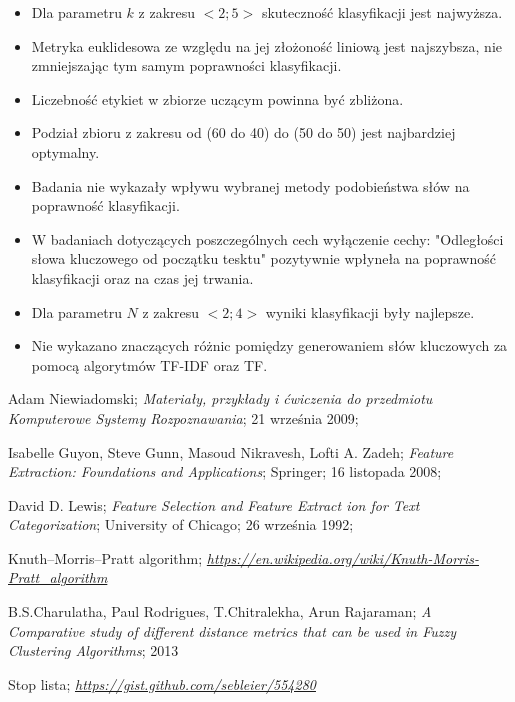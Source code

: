 \documentclass{classrep}
\begin{document}
\begin{itemize}
    \item Dla parametru $k$ z zakresu $<2;5>$ skuteczność klasyfikacji jest najwyższa.
    \item Metryka euklidesowa ze względu na jej złożoność liniową jest najszybsza, nie zmniejszając
            tym samym poprawności klasyfikacji.
    \item Liczebność etykiet w zbiorze uczącym powinna być zbliżona.
    \item Podział zbioru z zakresu od (60 do 40) do (50 do 50) jest najbardziej optymalny.
    \item Badania nie wykazały wpływu wybranej metody podobieństwa słów na poprawność klasyfikacji.
    \item W badaniach dotyczących poszczególnych cech wyłączenie cechy: "Odległości słowa kluczowego
        od początku tesktu" pozytywnie wpłyneła na poprawność klasyfikacji oraz na czas jej trwania.
    \item Dla parametru $N$ z zakresu $<2;4>$ wyniki klasyfikacji były najlepsze.
    \item Nie wykazano znaczących różnic pomiędzy generowaniem słów kluczowych za pomocą algorytmów TF-IDF oraz TF.
\end{itemize}


\begin{thebibliography}{0}

 Adam Niewiadomski;
\textsl{Materiały, przykłady i ćwiczenia do przedmiotu
Komputerowe Systemy Rozpoznawania}; 21 września 2009;

 Isabelle Guyon, Steve Gunn, Masoud Nikravesh, Lofti A. Zadeh;
\textsl{Feature Extraction: Foundations and Applications}; Springer; 16 listopada 2008;

 David D. Lewis;
\textsl{Feature Selection and Feature Extract ion for Text Categorization}; University of Chicago; 26 września 1992;

 Knuth–Morris–Pratt algorithm;
\textsl{\url{https://en.wikipedia.org/wiki/Knuth-Morris-Pratt_algorithm}}

 B.S.Charulatha, Paul Rodrigues, T.Chitralekha, Arun Rajaraman;
\textsl{A Comparative study of different distance metrics that can be used in Fuzzy Clustering Algorithms}; 2013

 Stop lista;
\textsl{\url{https://gist.github.com/sebleier/554280}}

\end{thebibliography}
\end{document}
